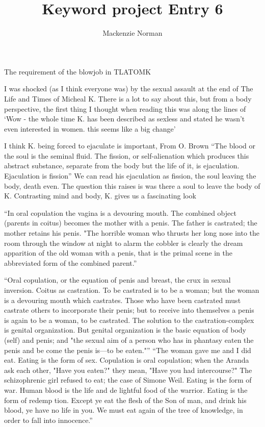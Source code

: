 \documentclass{article}
\title{Keyword project Entry 6}
\author{Mackenzie Norman}
\begin{document}
\maketitle 
The requirement of the blowjob in TLATOMK

I was shocked (as I think everyone was) by the sexual assault at the end of The Life and Times of Micheal K. There is a lot to say about this, but from a body perspective, the first thing I thought when reading this was along the lines of `Wow - the whole time K. has been described as sexless and stated he wasn't even interested in women. this seems like a big change' 

I think K. being forced to ejaculate is important, From O. Brown ``The blood or the soul is the seminal fluid. The fission, or self-alienation which produces this abstract substance, separate from the body but the life of it, is ejaculation. Ejaculation is fission'' We can read his ejaculation as fission, the soul leaving the body, death even. The question this raises is was there a soul to leave the body of K. Contrasting mind and body, K. gives us a fascinating look

``In oral copulation the vagina is a devouring mouth.
 The combined object (parents in coitus) becomes the
 mother with a penis. The father is castrated; the mother
 retains his penis. "The horrible woman who thrusts her
 long nose into the room through the window at night
 to alarm the cobbler is clearly the dream apparition of
 the old woman with a penis, that is the primal scene in
 the abbreviated form of the combined parent.''

 ``Oral copulation, or the equation of penis and breast,
 the crux in sexual inversion. Coitus as castration. To be
 castrated is to be a woman; but the woman is a devouring
 mouth which castrates. Those who have been castrated
 must castrate others to incorporate their penis; but to receive into themselves a penis is again to be a woman, to
 be castrated. The solution to the castration-complex is
 genital organization. But genital organization is the basic
 equation of body (self) and penis; and "the sexual aim
 of a person who has in phantasy eaten the penis and be
come the penis is—to be eaten."''
``The woman gave me and
 I did eat. Eating is the form of sex. Copulation is oral
 copulation; when the Aranda ask each other, "Have you
 eaten?" they mean, "Have you had intercourse?" The
 schizophrenic girl refused to eat; the case of Simone Weil.
 Eating is the form of war. Human blood is the life and de
lightful food of the warrior. Eating is the form of redemp
tion. Except ye eat the flesh of the Son of man, and drink
 his blood, ye have no life in you. We must eat again of the
 tree of knowledge, in order to fall into innocence.''
\end{document}
